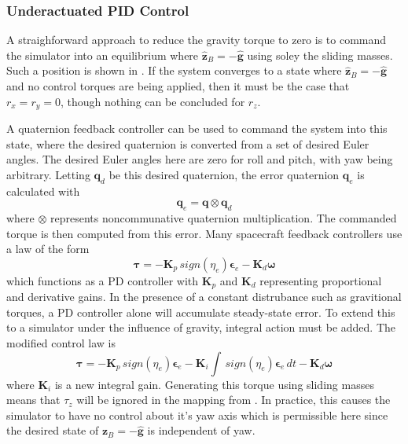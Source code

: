 \subsubsection{Underactuated PID Control}\label{sec:under_PID}

A straighforward approach to reduce the gravity torque to zero is to command the simulator into an equilibrium where $\hat{\bm{z}}_B=-\hat{\bm{g}}$ using soley the sliding masses. Such a position is shown in . If the system converges to a state where $\hat{\bm{z}}_B=-\hat{\bm{g}}$ and no control torques are being applied, then it must be the case that $r_x=r_y=0$, though nothing can be concluded for $r_z$.

A quaternion feedback controller can be used to command the system into this state, where the desired quaternion is converted from a set of desired Euler angles. The desired Euler angles here are zero for roll and pitch, with yaw being arbitrary. Letting $\bm{q}_d$ be this desired quaternion, the error quaternion $\bm{q}_e$ is calculated with
\begin{equation}
    \bm{q}_e = \bm{q}\otimes\bm{q}_d
\end{equation}
where $\otimes$ represents noncommunative quaternion multiplication. The commanded torque is then computed from this error. Many spacecraft feedback controllers use a law of the form
\begin{equation}\label{equation:spacecraft_PD}
    \bm{\tau} = -\bm{K}_p\,sign(\eta_e)\bm{\epsilon}_e-\bm{K}_d\bm{\omega}
\end{equation}
which functions as a PD controller with $\bm{K}_p$ and $\bm{K}_d$ representing proportional and derivative gains. In the presence of a constant distrubance such as gravitional torques, a PD controller alone will accumulate steady-state error. To extend this to a simulator under the influence of gravity, integral action must be added. The modified control law is
\begin{equation}
    \bm{\tau} = -\bm{K}_p\,sign(\eta_e)\bm{\epsilon}_e
    -\bm{K}_i\int\,sign(\eta_e)\bm{\epsilon}_e\,dt
    -\bm{K}_d\bm{\omega}
\end{equation}
where $\bm{K}_i$ is a new integral gain. Generating this torque using sliding masses means that $\tau_z$ will be ignored in the mapping from . In practice, this causes the simulator to have no control about it's yaw axis which is permissible here since the desired state of ${\bm{z}}_B=-\hat{\bm{g}}$ is independent of yaw.
 

